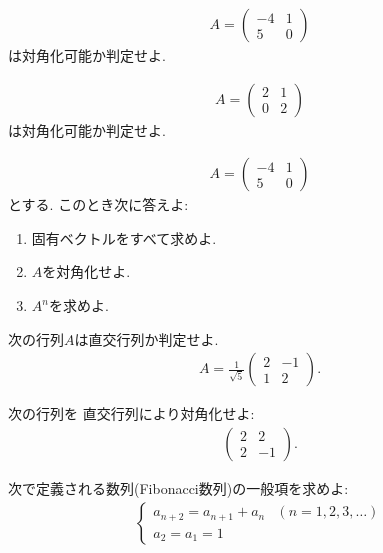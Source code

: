 \begin{quiz}
  \label{quiz:6:2}
  \begin{align*}
    A=\begin{pmatrix}-4&1\\5&0\end{pmatrix}
  \end{align*}
  は対角化可能か判定せよ.
\end{quiz}

\begin{quiz}
  \label{quiz:6:3}
  \begin{align*}
    A=\begin{pmatrix}2&1\\0&2\end{pmatrix}
  \end{align*}
  は対角化可能か判定せよ.
\end{quiz}

\begin{quiz}
  \label{quiz:6:4}
  \begin{align*}
    A=\begin{pmatrix}-4&1\\5&0\end{pmatrix}
  \end{align*}
  とする.
  このとき次に答えよ:
  \begin{enumerate}
  \item 固有ベクトルをすべて求めよ.
  \item $A$を対角化せよ.
  \item $A^n$を求めよ.
  \end{enumerate}
\end{quiz}

\begin{quiz}
  \label{quiz:6:5}
  次の行列$A$は直交行列か判定せよ. 
  \begin{align*}
   A=\frac{1}{\sqrt{5}}
    \begin{pmatrix}
      2&-1\\
      1&2
    \end{pmatrix}.
  \end{align*}
\end{quiz}

\begin{quiz}
  \label{quiz:6:6}
  次の行列を
  直交行列により対角化せよ:
  \begin{align*}
    \begin{pmatrix}
      2&2\\2&-1
    \end{pmatrix}.
  \end{align*}
\end{quiz}


\begin{quiz}
  次で定義される数列(Fibonacci数列)の一般項を求めよ:
  \begin{align*}
    \begin{cases}
      a_{n+2}=a_{n+1}+a_n&(n=1,2,3,\ldots)\\
      a_{2}=a_{1}=1
    \end{cases}
  \end{align*}
\end{quiz}
